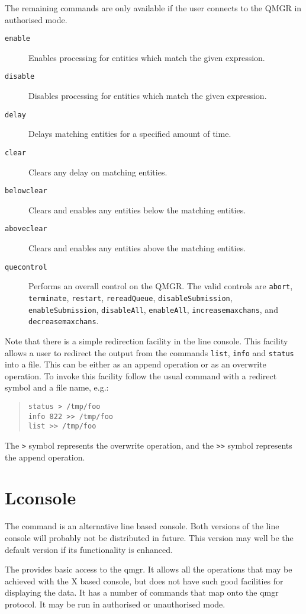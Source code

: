 The remaining commands are only available if the user connects to the
QMGR in authorised mode.

\begin{description}
\item[\verb+enable+] Enables processing for entities which match the given expression.
\item[\verb+disable+] Disables processing for entities which match the given expression.
\item[\verb+delay+] Delays matching entities for a specified amount of time.
\item[\verb+clear+] Clears any delay on matching entities.
\item[\verb+belowclear+] Clears and enables any entities below the
matching entities.
\item[\verb+aboveclear+] Clears and enables any entities above the
matching entities.
\item[\verb+quecontrol+] Performs an overall control on the QMGR.
The valid controls are \verb+abort+, \verb+terminate+, \verb+restart+,
\verb+rereadQueue+, \verb+disableSubmission+, \verb+enableSubmission+,
\verb+disableAll+, \verb+enableAll+, \verb+increasemaxchans+, and \verb+decreasemaxchans+.
\end{description}

Note that there is a simple redirection facility in the line console.
This facility allows a user to redirect the output from the commands
\verb+list+, \verb+info+ and \verb+status+ into a file.
This can be either as an append operation or as an overwrite
operation.
To invoke this facility follow the usual command with a 
redirect symbol and a file name,
e.g.:
\begin{quote}\small\begin{verbatim}
status > /tmp/foo
info 822 >> /tmp/foo
list >> /tmp/foo
\end{verbatim}\end{quote}
The \verb+>+ symbol represents the overwrite operation, and the
\verb+>>+ symbol represents the append operation.

\section{Lconsole}
The  command is an alternative line based console. Both
versions of the line console will probably not be distributed in
future. This version may well be the default version if its
functionality is enhanced.

The  provides basic access to the qmgr. It allows all
the operations that may be achieved with the X based console, but does
not have such good facilities for displaying the data. It has a number
of commands that map onto the qmgr protocol. It may be run in
authorised or unauthorised mode.

